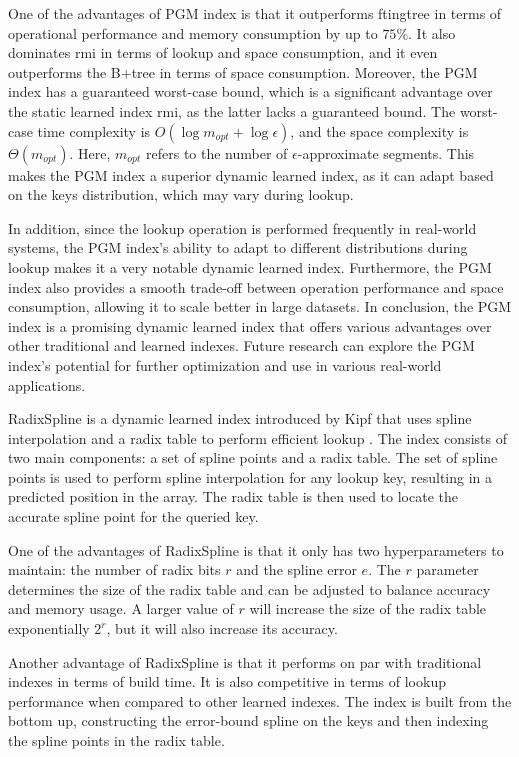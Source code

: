 One of the advantages of PGM index is that it outperforms \acrshort{ftingtree} in terms of operational performance and memory consumption by up to $75\%$. It also dominates \acrshort{rmi} in terms of lookup and space consumption, and it even outperforms the B+tree in terms of space consumption. Moreover, the PGM index has a guaranteed worst-case bound, which is a significant advantage over the static learned index \acrshort{rmi}, as the latter lacks a guaranteed bound. The worst-case time complexity is $O(\log m_{opt} + \log \epsilon)$, and the space complexity is $\Theta(m_{opt})$. Here, $m_{opt}$ refers to the number of $\epsilon$-approximate segments. This makes the PGM index a superior dynamic learned index, as it can adapt based on the keys distribution, which may vary during lookup.

In addition, since the lookup operation is performed frequently in real-world systems, the PGM index's ability to adapt to different distributions during lookup makes it a very notable dynamic learned index. Furthermore, the PGM index also provides a smooth trade-off between operation performance and space consumption, allowing it to scale better in large datasets. In conclusion, the PGM index is a promising dynamic learned index that offers various advantages over other traditional and learned indexes. Future research can explore the PGM index's potential for further optimization and use in various real-world applications. 

RadixSpline is a dynamic learned index introduced by Kipf that uses spline interpolation and a radix table to perform efficient lookup \cite{kipf2020radixspline}. The index consists of two main components: a set of spline points and a radix table. The set of spline points is used to perform spline interpolation for any lookup key, resulting in a predicted position in the array. The radix table is then used to locate the accurate spline point for the queried key.

One of the advantages of RadixSpline is that it only has two hyperparameters to maintain: the number of radix bits $r$ and the spline error $e$. The $r$ parameter determines the size of the radix table and can be adjusted to balance accuracy and memory usage. A larger value of $r$ will increase the size of the radix table exponentially $2^r$, but it will also increase its accuracy.

Another advantage of RadixSpline is that it performs on par with traditional indexes in terms of build time. It is also competitive in terms of lookup performance when compared to other learned indexes. The index is built from the bottom up, constructing the error-bound spline on the keys and then indexing the spline points in the radix table.


